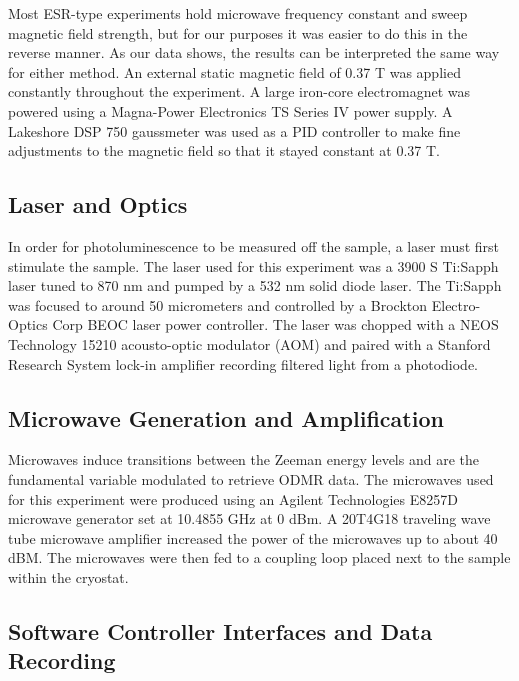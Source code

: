 \documentclass[oneside, astronomy, noacknowlegments]{BYUPhys}
\begin{document}
Most ESR-type experiments hold microwave frequency constant and sweep magnetic field strength, but for our purposes it was easier to do this in the reverse manner. As our data shows, the results can be interpreted the same way for either method. An external static magnetic field of 0.37 T was applied constantly throughout the experiment. A large iron-core electromagnet was powered using a Magna-Power Electronics TS Series IV power supply. A Lakeshore DSP 750 gaussmeter was used as a PID controller to make fine adjustments to the magnetic field so that it stayed constant at 0.37 T.

\subsection{Laser and Optics}

In order for photoluminescence to be measured off the sample, a laser must first stimulate the sample. The laser used for this experiment was a 3900 S Ti:Sapph laser tuned to 870 nm and pumped by a 532 nm solid diode laser. The Ti:Sapph was focused to around 50 micrometers and controlled by a Brockton Electro-Optics Corp BEOC laser power controller. The laser was chopped with a NEOS Technology 15210 acousto-optic modulator (AOM) and paired with a Stanford Research System lock-in amplifier recording filtered light from a photodiode.

\subsection{Microwave Generation and Amplification}

Microwaves induce transitions between the Zeeman energy levels and are the fundamental variable modulated to retrieve ODMR data. The microwaves used for this experiment were produced using an Agilent Technologies E8257D microwave generator set at 10.4855 GHz at 0 dBm. A 20T4G18 traveling wave tube microwave amplifier increased the power of the microwaves up to about 40 dBM. The microwaves were then fed to a coupling loop placed next to the sample within the cryostat.

\subsection{Software Controller Interfaces and Data Recording}
\end{document}
